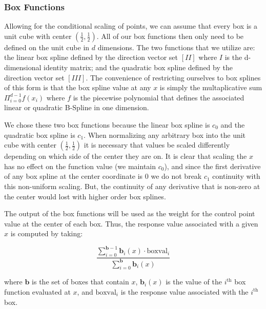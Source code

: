 \documentclass[11pt,margin=1in]{article}
\begin{document}
\subsubsection*{Box Functions}

Allowing for the conditional scaling of points, we can assume that
every box is a unit cube with center $(\frac{1}{2},\frac{1}{2})$. All
of our box functions then only need to be defined on the unit cube in
$d$ dimensions. The two functions that we utilize are: the linear box
spline defined by the direction vector set $[ I I ]$ where $I$ is the
d-dimensional identity matrix; and the quadratic box spline defined by
the direction vector set $[ I I I ]$. The convenience of restricting
ourselves to box splines of this form is that the box spline value at
any $x$ is simply the multaplicative sum $\Pi_{i=0}^{d-1} f(x_i)$
where $f$ is the piecewise polynomial that defines the associated
linear or quadratic B-Spline in one dimension.

We chose these two box functions because the linear box spline is
$c_0$ and the quadratic box spline is $c_1$. When normalizing any
arbitrary box into the unit cube with center
$(\frac{1}{2},\frac{1}{2})$ it is necessary that values be scaled
differently depending on which side of the center they are on. It is
clear that scaling the $x$ has no effect on the function value (we
maintain $c_0$), and since the first derivative of any box spline at
the center coordinate is 0 we do not break $c_1$ continuity with this
non-uniform scaling. But, the continuity of any derivative that is
non-zero at the center would lost with higher order box splines.

The output of the box functions will be used as the weight for the
control point value at the center of each box. Thus, the response
value associated with a given $x$ is computed by taking:

$$ \frac{\sum_{i=0}^{\mathbf{b}-1} \mathbf{b}_i(x) \cdot \text{boxval}_i}{\sum_{i=0}^{\mathbf{b}} \mathbf{b}_i(x) } $$

where $\mathbf{b}$ is the set of boxes that contain $x$,
$\mathbf{b}_i(x)$ is the value of the $i^{\text{th}}$ box function
evaluated at $x$, and $\text{boxval}_i$ is the response value
associated with the $i^{\text{th}}$ box.
\end{document}
